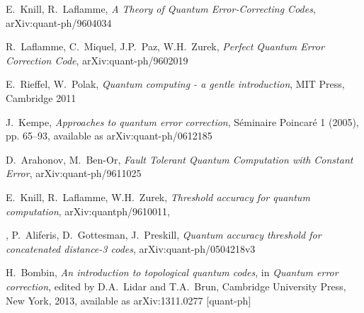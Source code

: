 \documentclass[a4paper, draft]{article}
\theoremstyle{own}
\theoremstyle{remark}
\begin{document}
\begin{thebibliography}{9}
E.~Knill, R.~Laflamme, \emph{A Theory of Quantum Error-Correcting Codes}, arXiv:quant-ph/9604034

R.~Laflamme, C.~Miquel, J.P.~Paz, W.H.~Zurek, \emph{Perfect Quantum Error Correction Code}, 	arXiv:quant-ph/9602019	
	

E.~Rieffel, W.~Polak, \emph{Quantum computing - a gentle introduction},
MIT Press, Cambridge 2011

J.~Kempe, \emph{Approaches to quantum error correction}, S\'eminaire Poincar\'e 1 (2005), pp. 65--93, available as arXiv:quant-ph/0612185

D.~Arahonov, M.~Ben-Or, \emph{Fault Tolerant Quantum Computation with Constant Error},
arXiv:quant-ph/9611025

E.~Knill, R.~Laflamme, W.H.~Zurek, \emph{Threshold accuracy for quantum computation}, arXiv:quantph/9610011,

,
P.~Aliferis, D.~Gottesman, J.~Preskill, \emph{Quantum accuracy threshold for concatenated distance-3 codes}, arXiv:quant-ph/0504218v3

H.~Bombin, 
\emph{An introduction to topological quantum codes}, in \emph{Quantum error correction}, edited by D.A.~Lidar and T.A.~Brun, Cambridge University Press, New York, 2013, available as arXiv:1311.0277 [quant-ph]

\end{thebibliography}
\end{document}
